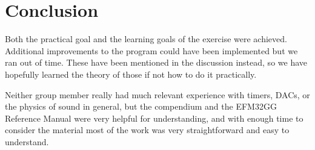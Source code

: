 \chapter{Conclusion}

Both the practical goal and the learning goals of the exercise were achieved. Additional improvements to the program could have been implemented but we ran out of time. These have been mentioned in the discussion instead, so we have hopefully learned the theory of those if not how to do it practically.

Neither group member really had much relevant experience with timers, DACs, or the physics of sound in general, but the compendium \cite{compendium} and the EFM32GG Reference Manual \cite{efm32ggref} were very helpful for understanding, and with enough time to consider the material most of the work was very straightforward and easy to understand.
